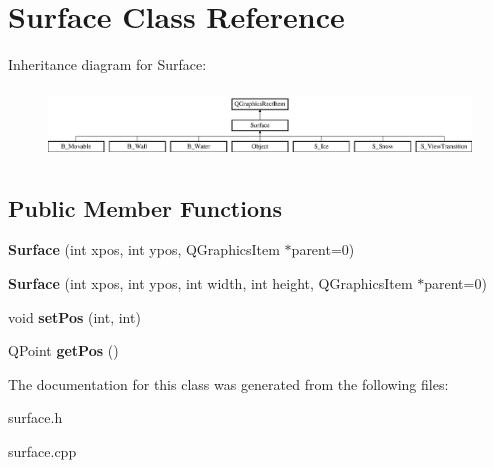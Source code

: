 \hypertarget{class_surface}{}\section{Surface Class Reference}
\label{class_surface}
Inheritance diagram for Surface\+:\begin{figure}[H]
\begin{center}
\leavevmode
\includegraphics[height=1.875000cm]{class_surface}
\end{center}
\end{figure}
\subsection*{Public Member Functions}
\begin{DoxyCompactItemize}
\item 
\hypertarget{class_surface_ac03bea7e4e17982fd17f8a571035a6f0}{}{\bfseries Surface} (int xpos, int ypos, Q\+Graphics\+Item $\ast$parent=0)\label{class_surface_ac03bea7e4e17982fd17f8a571035a6f0}

\item 
\hypertarget{class_surface_a3e1af81e4723f854196608b966a86415}{}{\bfseries Surface} (int xpos, int ypos, int width, int height, Q\+Graphics\+Item $\ast$parent=0)\label{class_surface_a3e1af81e4723f854196608b966a86415}

\item 
\hypertarget{class_surface_a025ed38853ae95be3c6fe8814711ffc3}{}void {\bfseries set\+Pos} (int, int)\label{class_surface_a025ed38853ae95be3c6fe8814711ffc3}

\item 
\hypertarget{class_surface_acbdbf91a4cca74bb9da6c8a2fa932cd7}{}Q\+Point {\bfseries get\+Pos} ()\label{class_surface_acbdbf91a4cca74bb9da6c8a2fa932cd7}

\end{DoxyCompactItemize}


The documentation for this class was generated from the following files\+:\begin{DoxyCompactItemize}
\item 
surface.\+h\item 
surface.\+cpp\end{DoxyCompactItemize}
